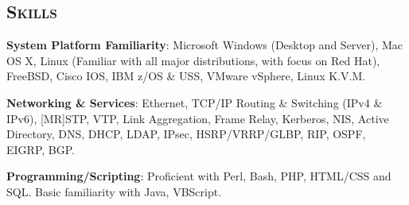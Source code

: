\begin{resume}



\section{\textsc{Skills}}

\textbf{System Platform Familiarity}: Microsoft Windows (Desktop and Server), Mac OS X, Linux (Familiar with all major distributions, with focus on Red Hat), FreeBSD, Cisco IOS, IBM z/OS \& USS, VMware vSphere, Linux K.V.M.

\textbf{Networking \& Services}: Ethernet, TCP/IP Routing \& Switching (IPv4 \& IPv6), [MR]STP, VTP, Link Aggregation, Frame Relay, Kerberos, NIS, Active Directory, DNS, DHCP, LDAP, IPsec, HSRP/VRRP/GLBP, RIP, OSPF, EIGRP, BGP.

\textbf{Programming/Scripting}: Proficient with Perl, Bash, PHP, HTML/CSS and SQL. Basic familiarity with Java, VBScript.










\end{resume}

